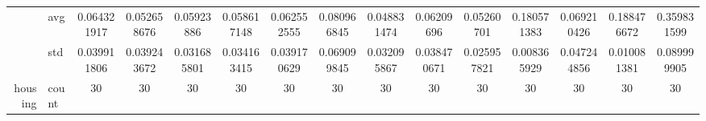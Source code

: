 \begin{table}[H]
{\begin{tabular}{rlccc|c|c|c|c|c|ccccc}
			                                                                               & avg                & \cellcolor[rgb]{ 1,  .922,  .518}0.064321917                                   & \cellcolor[rgb]{ .557,  .792,  .49}0.052658676                                 & \cellcolor[rgb]{ .851,  .878,  .506}0.05923886                                 & \cellcolor[rgb]{ .824,  .871,  .506}0.058617148 & \cellcolor[rgb]{ 1,  .922,  .518}0.062552555                                   & \cellcolor[rgb]{ 1,  .89,  .514}0.080966845     & \cellcolor[rgb]{ .388,  .745,  .482}\textcolor[rgb]{ 0,  .38,  0}{0.048831474} & \cellcolor[rgb]{ .976,  .914,  .514}0.06209696  & \cellcolor[rgb]{ .553,  .792,  .49}0.05260701   & \cellcolor[rgb]{ .992,  .722,  .482}0.180571383 & \cellcolor[rgb]{ 1,  .914,  .518}0.069210426    & \cellcolor[rgb]{ .992,  .706,  .478}0.188476672 & \cellcolor[rgb]{ .973,  .412,  .42}0.359831599  \\
			                                                                               & std                & 0.039911806                                                                    & 0.039243672                                                                    & 0.031685801                                                                    & 0.034163415                                     & 0.039170629                                                                    & 0.069099845                                     & 0.032095867                                                                    & 0.038470671                                     & 0.025957821                                     & 0.008365929                                     & 0.047244856                                     & 0.010081381                                     & 0.089999905                                     \\
			housing                                                                        & count              & 30                                                                             & 30                                                                             & 30                                                                             & 30                                              & 30                                                                             & 30                                              & 30                                                                             & 30                                              & 30                                              & 30                                              & 30                                              & 30                                              & 30                                              \\

\end{tabular}}
\end{table}
